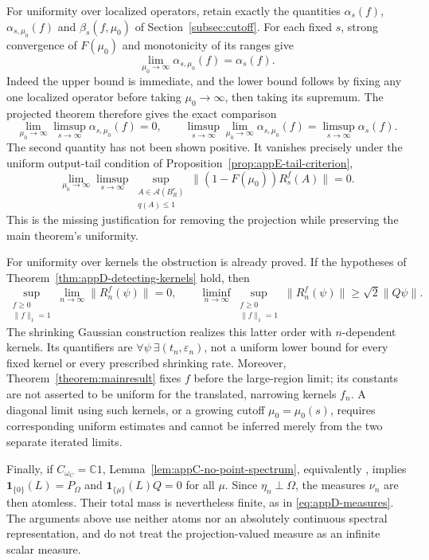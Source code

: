 \documentclass[a4paper,11pt]{article}
\theoremstyle{definition}
\begin{document}
For uniformity over localized operators, retain exactly the quantities
$\alpha_s(f)$, $\alpha_{s,\mu_0}(f)$ and $\beta_s(f,\mu_0)$ of
Section~\ref{subsec:cutoff}. For each fixed $s$, strong convergence of
$F(\mu_0)$ and monotonicity of its ranges give
\[
 \lim_{\mu_0\to\infty}\alpha_{s,\mu_0}(f)=\alpha_s(f).
\]
Indeed the upper bound is immediate, and the lower bound follows by fixing
any one localized operator before taking $\mu_0\to\infty$, then taking its
supremum. The projected theorem therefore gives the exact comparison
\begin{equation}
 \lim_{\mu_0\to\infty}\limsup_{s\to\infty}\alpha_{s,\mu_0}(f)=0,
 \qquad
 \limsup_{s\to\infty}\lim_{\mu_0\to\infty}\alpha_{s,\mu_0}(f)
 =\limsup_{s\to\infty}\alpha_s(f).
 \label{eq:appD-uniform-order}
\end{equation}
The second quantity has not been shown positive. It vanishes precisely under
the uniform output-tail condition of Proposition~\ref{prop:appE-tail-criterion},
\[
 \lim_{\mu_0\to\infty}\limsup_{s\to\infty}
 \sup_{\substack{A\in\mathcal A(B_R^r)\\q(A)\le1}}
 \|(1-F(\mu_0))R_s^f(A)\|=0.
\]
This is the missing justification for removing the projection while preserving
the main theorem's uniformity.

For uniformity over kernels the obstruction is already proved. If the
hypotheses of Theorem~\ref{thm:appD-detecting-kernels} hold, then
\begin{equation}
 \sup_{\substack{f\ge0\\\|f\|_1=1}}\lim_{n\to\infty}\|R_n^f(\psi)\|=0,
 \qquad
 \liminf_{n\to\infty}\sup_{\substack{f\ge0\\\|f\|_1=1}}
       \|R_n^f(\psi)\|\ge\sqrt2\|Q\psi\|.
 \label{eq:appD-kernel-order}
\end{equation}
The shrinking Gaussian construction realizes this latter order with
$n$-dependent kernels. Its quantifiers are
$\forall\psi\ \exists(t_n,\varepsilon_n)$, not a uniform lower bound for every
fixed kernel or every prescribed shrinking rate. Moreover,
Theorem~\ref{theorem:mainresult} fixes $f$ before the large-region limit;
its constants are not asserted to be uniform for the translated,
narrowing kernels $f_n$. A diagonal limit using such kernels, or a growing
cutoff $\mu_0=\mu_0(s)$, requires corresponding uniform estimates and cannot
be inferred merely from the two separate iterated limits.


Finally, if $C_{\omega_{C}}=\mathbb C1$, Lemma~\ref{lem:appC-no-point-spectrum}, equivalently \cite[Lemma~2.1]{MarrakchiVaes2024Ergodic}, implies
$\mathbf1_{\{0\}}(L)=P_\Omega$ and $\mathbf1_{\{\mu\}}(L)Q=0$ for all $\mu$.
Since $\eta_n\perp\Omega$, the measures $\nu_n$ are then atomless. Their total mass is nevertheless finite, as in \eqref{eq:appD-measures}. The arguments above use neither atoms nor an absolutely continuous spectral representation, and do not treat the projection-valued measure as an infinite scalar measure.
\end{document}
